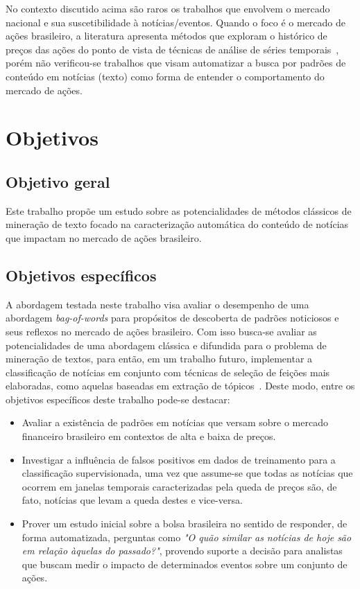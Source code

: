 \documentclass[11pt,a4paper]{article}
\begin{document}
No contexto discutido acima são raros os trabalhos que envolvem o mercado nacional e sua suscetibilidade à notícias/eventos. Quando o foco é o mercado de ações brasileiro, a literatura apresenta métodos que exploram o histórico de preços das ações do ponto de vista de técnicas de análise de séries temporais~\cite{Edgard:Dissertacao}, porém não verificou-se trabalhos que visam automatizar a busca por padrões de conteúdo em notícias (texto) como forma de entender o comportamento do mercado de ações.

\section{Objetivos}\label{sec:objetivos}

\subsection{Objetivo geral}

Este trabalho propõe um estudo sobre as potencialidades de métodos clássicos de mineração de texto focado na caracterização automática do conteúdo de notícias que impactam no mercado de ações brasileiro.

\subsection{Objetivos específicos}

A abordagem testada neste trabalho visa avaliar o desempenho de uma abordagem \textit{bag-of-words} \cite{Manning:IR} para propósitos de descoberta de padrões noticiosos e seus reflexos no mercado de ações brasileiro. Com isso busca-se avaliar as potencialidades de uma abordagem clássica e difundida para o problema de mineração de textos, para então, em um trabalho futuro, implementar a classificação de notícias em conjunto com técnicas de seleção de feições mais elaboradas, como aquelas baseadas em extração de tópicos~\cite{Mahajan:2008}. Deste modo, entre os objetivos específicos deste trabalho pode-se destacar:

\begin{itemize}
  \item Avaliar a existência de padrões em notícias que versam sobre o mercado financeiro brasileiro em contextos de alta e baixa de preços.
  \item Investigar a influência de falsos positivos em dados de treinamento para a classificação supervisionada, uma vez que assume-se que todas as notícias que ocorrem em janelas temporais caracterizadas pela queda de preços são, de fato, notícias que levam a queda destes e vice-versa.
  \item Prover um estudo inicial sobre a bolsa brasileira no sentido de responder, de forma automatizada, perguntas como \textit{"O quão similar as notícias de hoje são em relação àquelas do passado?"}, provendo suporte a decisão para analistas que buscam medir o impacto de determinados eventos sobre um conjunto de ações.
\end{itemize}
\end{document}
